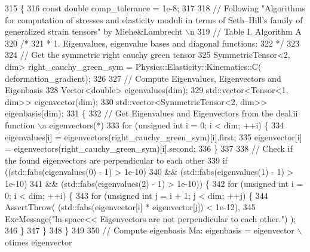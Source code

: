\begin{DoxyCode}
315     \{
316         \textcolor{keyword}{const} \textcolor{keywordtype}{double} comp\_tolerance = 1e-8;
317 
318         \textcolor{comment}{// Following "Algorithms for computation of stresses and elasticity moduli in terms of Seth–Hill’s
       family of generalized strain tensors" by Miehe&Lambrecht \(\backslash\)n}
319         \textcolor{comment}{// Table I. Algorithm A}
320         \textcolor{comment}{/*}
321 \textcolor{comment}{         * 1. Eigenvalues, eigenvalue bases and diagonal functions:
}
322 \textcolor{comment}{         */}
323 
324         \textcolor{comment}{// Get the symmetric right cauchy green tensor}
325          SymmetricTensor<2, dim> right\_cauchy\_green\_sym = Physics::Elasticity::Kinematics::C(
      deformation\_gradient);
326 
327         \textcolor{comment}{// Compute Eigenvalues, Eigenvectors and Eigenbasis}
328          Vector<double> eigenvalues(dim);
329          std::vector<Tensor<1, dim>> eigenvector(dim);
330          std::vector<SymmetricTensor<2, dim>> eigenbasis(dim);
331          \{
332             \textcolor{comment}{// Get Eigenvalues and Eigenvectors from the deal.ii function \(\backslash\)a eigenvectors(*)}
333             \textcolor{keywordflow}{for} (\textcolor{keywordtype}{unsigned} \textcolor{keywordtype}{int} i = 0; i < dim; ++i) \{
334                 eigenvalues[i] = eigenvectors(right\_cauchy\_green\_sym)[i].first;
335                 eigenvector[i] = eigenvectors(right\_cauchy\_green\_sym)[i].second;
336             \}
337 
338             \textcolor{comment}{// Check if the found eigenvectors are perpendicular to each other}
339             \textcolor{keywordflow}{if} ((std::fabs(eigenvalues(0) - 1) > 1e-10)
340                 && (std::fabs(eigenvalues(1) - 1) > 1e-10)
341                 && (std::fabs(eigenvalues(2) - 1) > 1e-10)) \{
342                 \textcolor{keywordflow}{for} (\textcolor{keywordtype}{unsigned} \textcolor{keywordtype}{int} i = 0; i < dim; ++i) \{
343                     \textcolor{keywordflow}{for} (\textcolor{keywordtype}{unsigned} \textcolor{keywordtype}{int} j = i + 1; j < dim; ++j) \{
344                         AssertThrow( (std::fabs(eigenvector[i] * eigenvector[j]) < 1e-12),
345                                      ExcMessage(\textcolor{stringliteral}{"ln-space<< Eigenvectors are not perpendicular to each
       other."}) );
346                     \}
347                 \}
348             \}
349 
350             \textcolor{comment}{// Compute eigenbasis Ma: eigenbasis = eigenvector \(\backslash\)otimes eigenvector}

\end{DoxyCode}
